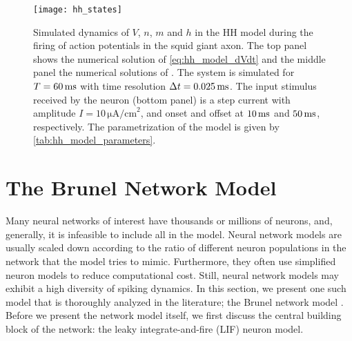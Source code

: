 \begin{figure}[H]
    \centering
    \texttt{[image: hh\_states]}
    \caption{Simulated dynamics of $V$, $n$, $m$ and $h$ in the HH model during the firing of action potentials in the squid giant axon. The top panel shows the numerical solution of \autoref{eq:hh_model_dVdt} and the middle panel the numerical solutions of . The system is simulated for $T = 60 \,\mathrm{ms}$ with time resolution $\Delta t=0.025 \,\mathrm{ms}$. The input stimulus received by the neuron (bottom panel) is a step current with amplitude $I = 10 \, \mathrm{\mu A/cm}^2$, and onset and offset at $10 \,\mathrm{ms}$ and $50 \,\mathrm{ms}$, respectively. The parametrization of the model is given by \autoref{tab:hh_model_parameters}. 
    }
    \label{fig:hh_states}
\end{figure}








\section{The Brunel Network Model}

Many neural networks of interest have thousands or millions of neurons, and, generally, it is infeasible to include all in the model. Neural network models are usually scaled down according to the ratio of different neuron populations in the network that the model tries to mimic. Furthermore, they often use simplified neuron models to reduce computational cost. Still, neural network models may exhibit a high diversity of spiking dynamics. In this section, we present one such model that is thoroughly analyzed in the literature; the Brunel network model \cite{Brunel2000}. Before we present the network model itself, we first discuss the central building block of the network: the leaky integrate-and-fire (LIF) neuron model. 


